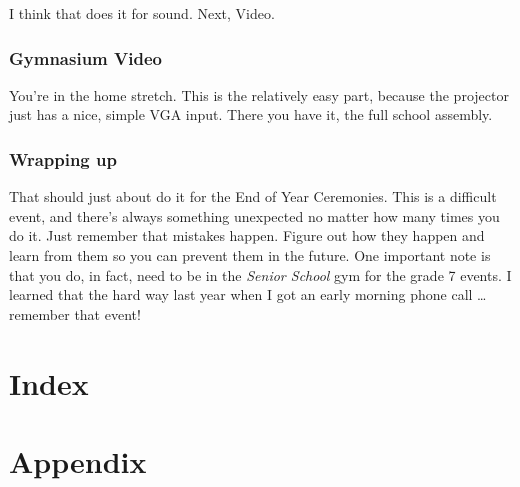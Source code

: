 \documentclass[letterpaper,10pt,oneside,headsepline]{scrreprt}
\begin{document}
I think that does it for sound. Next, Video.

\subsection{Gymnasium Video}
You're in the home stretch. This is the relatively easy part, because the projector just has a nice, simple VGA input. There you have it, the full school assembly.

\subsection{Wrapping up}
That should just about do it for the End of Year Ceremonies. This is a difficult event, and there's always something unexpected no matter how many times you do it. Just remember that mistakes happen. Figure out how they happen and learn from them so you can prevent them in the future. One important note is that you do, in fact, need to be in the \textit{Senior School} gym for the grade 7 events. I learned that the hard way last year when I got an early morning phone call \ldots remember that event!

\chapter{Index}
\printindex

\appendix
\chapter{Appendix}
\end{document}
